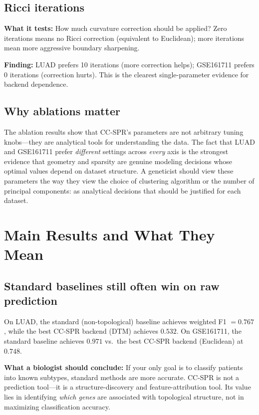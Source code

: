 \documentclass[11pt]{article}
\makeatletter
\newenvironment{biobox}{%
  \par\vspace{8pt}\noindent\fboxrule=1pt\fboxsep=8pt%
  \begin{lrbox}{\@tempboxa}\begin{minipage}{\dimexpr\linewidth-2\fboxsep-2\fboxrule}}%
  {\end{minipage}\end{lrbox}\fcolorbox{green!40!black}{white}{\usebox{\@tempboxa}}\par\vspace{8pt}}
\newenvironment{keybox}{%
  \par\vspace{8pt}\noindent\fboxrule=1.5pt\fboxsep=8pt%
  \begin{lrbox}{\@tempboxa}\begin{minipage}{\dimexpr\linewidth-2\fboxsep-2\fboxrule}}%
  {\end{minipage}\end{lrbox}\fcolorbox{black}{white}{\usebox{\@tempboxa}}\par\vspace{8pt}}
\makeatother
\begin{document}
\subsection{Ricci iterations}

\textbf{What it tests:} How much curvature correction should be applied?
Zero iterations means no Ricci correction (equivalent to Euclidean); more iterations mean more aggressive boundary sharpening.

\textbf{Finding:} LUAD prefers 10 iterations (more correction helps); GSE161711 prefers 0 iterations (correction hurts).
This is the clearest single-parameter evidence for backend dependence.

\subsection{Why ablations matter}

\begin{biobox}
The ablation results show that CC-SPR's parameters are not arbitrary tuning knobs---they are analytical tools for understanding the data.
The fact that LUAD and GSE161711 prefer \emph{different} settings across \emph{every} axis is the strongest evidence that geometry and sparsity are genuine modeling decisions whose optimal values depend on dataset structure.
A geneticist should view these parameters the way they view the choice of clustering algorithm or the number of principal components: as analytical decisions that should be justified for each dataset.
\end{biobox}

\section{Main Results and What They Mean}
\label{sec:results}

\subsection{Standard baselines still often win on raw prediction}

On LUAD, the standard (non-topological) baseline achieves weighted F1 $= 0.767$, while the best CC-SPR backend (DTM) achieves $0.532$.
On GSE161711, the standard baseline achieves $0.971$ vs.\ the best CC-SPR backend (Euclidean) at $0.748$.

\begin{keybox}
\textbf{What a biologist should conclude:}
If your only goal is to classify patients into known subtypes, standard methods are more accurate.
CC-SPR is not a prediction tool---it is a structure-discovery and feature-attribution tool.
Its value lies in identifying \emph{which genes} are associated with topological structure, not in maximizing classification accuracy.
\end{keybox}
\end{document}
